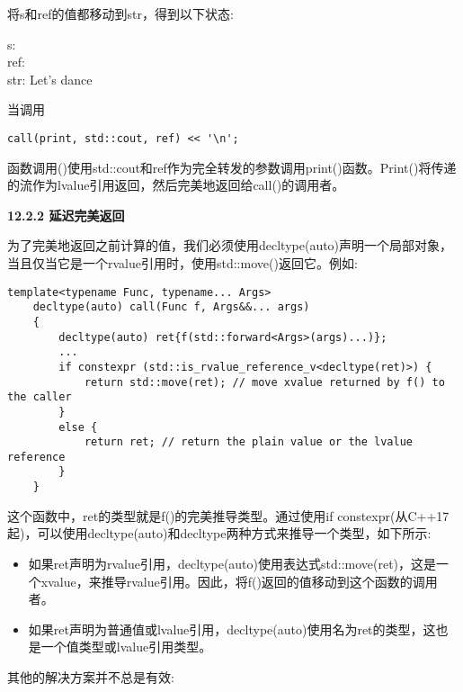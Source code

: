 将s和ref的值都移动到str，得到以下状态:\par

\begin{tcolorbox}[colback=white,colframe=black]
s: \\
ref: \\
str: Let's dance
\end{tcolorbox}

当调用\par

\begin{lstlisting}[caption={}]
call(print, std::cout, ref) << '\n';
\end{lstlisting}

函数调用()使用std::cout和ref作为完全转发的参数调用print()函数。Print()将传递的流作为lvalue引用返回，然后完美地返回给call()的调用者。\par

\hspace*{\fill} \par %
\textbf{12.2.2 延迟完美返回}

为了完美地返回之前计算的值，我们必须使用decltype(auto)声明一个局部对象，当且仅当它是一个rvalue引用时，使用std::move()返回它。例如:\par

\begin{lstlisting}[caption={}]
	template<typename Func, typename... Args>
	decltype(auto) call(Func f, Args&&... args)
	{
		decltype(auto) ret{f(std::forward<Args>(args)...)};
		...
		if constexpr (std::is_rvalue_reference_v<decltype(ret)>) {
			return std::move(ret); // move xvalue returned by f() to the caller
		}
		else {
			return ret; // return the plain value or the lvalue reference
		}
	}
\end{lstlisting}

这个函数中，ret的类型就是f()的完美推导类型。通过使用if constexpr(从C++17起)，可以使用decltype(auto)和decltype两种方式来推导一个类型，如下所示:\par

\begin{itemize}
	\item 如果ret声明为rvalue引用，decltype(auto)使用表达式std::move(ret)，这是一个xvalue，来推导rvalue引用。因此，将f()返回的值移动到这个函数的调用者。
	\item 如果ret声明为普通值或lvalue引用，decltype(auto)使用名为ret的类型，这也是一个值类型或lvalue引用类型。
\end{itemize}

其他的解决方案并不总是有效:\par

